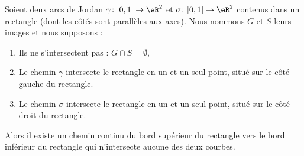 \begin{proposition}	\label{PROPooTUPHooLnSCkd}
	Soient deux arcs de Jordan \(\gamma \colon \mathopen[ 0,1\mathclose]\to \eR^2  \) et \(\sigma \colon \mathopen[ 0,1\mathclose]\to \eR^2  \) contenus dans un rectangle (dont les côtés sont parallèles aux axes). Nous nommons \( G\) et \( S\) leurs images et nous supposons :
	\begin{enumerate}
		\item
		      Ils ne s'intersectent pas : \( G\cap S=\emptyset\),
		\item
		      Le chemin \( \gamma\) intersecte le rectangle en un et un seul point, situé sur le côté gauche du rectangle.
		\item
		      Le chemin \( \sigma\) intersecte le rectangle en un et un seul point, situé sur le côté droit du rectangle.
	\end{enumerate}
	Alors il existe un chemin continu du bord supérieur du rectangle vers le bord inférieur du rectangle qui n'intersecte aucune des deux courbes.
\end{proposition}

